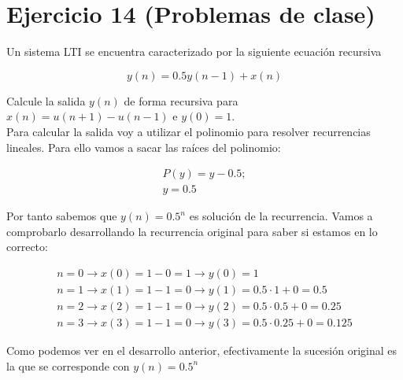 \documentclass[11pt,a4paper]{article}
\begin{document}
\tableofcontents
\thispagestyle{empty}

\newpage

\section{Ejercicio 14 (Problemas de clase)}

Un sistema LTI se encuentra caracterizado por la siguiente ecuación recursiva

\[y(n)=0.5y(n-1)+x(n)\]

Calcule la salida $y(n)$ de forma recursiva para $x(n)=u(n+1)-u(n-1)$ e $y(0)=1$.\\

Para calcular la salida voy a utilizar el polinomio para resolver recurrencias lineales. Para ello vamos a sacar las raíces del polinomio:

	\begin{gather*}
	P(y) = y - 0.5; \\
	y = 0.5
	\end{gather*}
	
	Por tanto sabemos que $y(n)=0.5^n$ es solución de la recurrencia. Vamos a comprobarlo desarrollando la recurrencia original para saber si estamos en lo correcto:

	\begin{gather*}
	n=0 \longrightarrow x(0) = 1-0 = 1 \longrightarrow y(0)=1 \\
	n=1 \longrightarrow x(1) = 1-1 = 0 \longrightarrow y(1)=0.5\cdot 1+0=0.5\\
	n=2 \longrightarrow x(2) = 1-1 = 0 \longrightarrow y(2)=0.5\cdot 0.5 + 0=0.25\\
	n=3 \longrightarrow x(3) = 1-1 = 0 \longrightarrow y(3)=0.5\cdot 0.25 + 0=0.125
	\end{gather*}
	
Como podemos ver en el desarrollo anterior, efectivamente la sucesión original es la que se corresponde con $y(n)=0.5^n$
\end{document}
